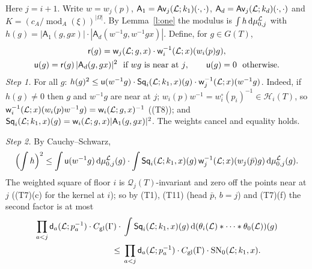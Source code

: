 \documentclass[11pt,a4paper]{article}
\makeatletter
\theoremstyle{plainx}
\theoremstyle{uprightx}
\renewenvironment{proof}[1][Proof]{\par\pushQED{\qed}\normalfont\topsep0pt\partopsep0pt
  \trivlist\item[\hskip\labelsep\itshape #1.]\ignorespaces}{\popQED\endtrivlist\@endpefalse}
\newcommand{\cL}{\mathcal{L}}
\newcommand{\dd}{\mathrm{d}}
\newcommand{\GT}[1]{G(#1)}
\newcommand{\Hl}[2]{\mathcal{H}_{#1}(#2)}
\newcommand{\Ql}[2]{\mathcal{Q}_{#1}(#2)}
\newcommand{\modA}{\operatorname{mod}_A}
\newcommand{\wl}[2]{w_{#1}(#2)}
\newcommand{\wo}[2]{w^{\circ}_{#1}(#2)}
\newcommand{\Inp}[1]{\textup{(#1)}}
\makeatother
\begin{document}
\begin{proof}[Proof of Theorem A\textup{(c)}]
Here $j=i+1$. Write $w=\wl{j}{p}$, $\mathsf{A}_1=\upperPairing{\cL}{j}{k_1}{\cdot}{\cdot}$,
$\mathsf{A}_d=\upperPairing{\cL}{j}{k_d}{\cdot}{\cdot}$ and $K=(c_A/\modA(\xi))^{|\Omega|}$. By
Lemma~\ref{l:one} the modulus is $\int h\,\dd\stackMeasure{\cL}_{0,j}$ with
$h(g)=|\mathsf{A}_1(g,gx)|\cdot|\mathsf{A}_d(w^{-1}g,w^{-1}gx)|$. Define, for $g\in\GT{T}$,
\[\begin{gathered}\mathsf{r}(g)=\floorWeight{\cL}{j}{g}{x}\cdot\invWeight{\cL}{i}{x}(\wl{i}{p}g),\\
\mathsf{u}(g)=\mathsf{r}(g)\,|\mathsf{A}_d(g,gx)|^{2}\ \text{ if $wg$ is near at $j$},\qquad\mathsf{u}(g)=0\ \text{ otherwise.}\end{gathered}\]
\emph{Step 1.} For all $g$: $h(g)^{2}\le\mathsf{u}(w^{-1}g)\cdot\weightedSquare{\cL}{i}{k_1}{x}{g}\cdot\invWeight{\cL}{j}{x}(w^{-1}g)$.
Indeed, if $h(g)\ne0$ then $g$ and $w^{-1}g$ are near at $j$; $\wl{i}{p}w^{-1}=\wo{i}{p_i}^{-1}\in\Hl{i}{T}$, so
$\invWeight{\cL}{i}{x}(\wl{i}{p}w^{-1}g)=\floorWeight{\cL}{i}{g}{x}^{-1}$ (\Inp{T8}); and
$\weightedSquare{\cL}{i}{k_1}{x}{g}=\floorWeight{\cL}{i}{g}{x}|\mathsf{A}_1(g,gx)|^2$. The weights cancel and
equality holds.

\emph{Step 2.} By Cauchy--Schwarz,
\[\Bigl(\int h\Bigr)^2\le\int\mathsf{u}(w^{-1}g)\,\dd\stackMeasure{\cL}_{0,j}(g)\cdot
\int\weightedSquare{\cL}{i}{k_1}{x}{g}\,\invWeight{\cL}{j}{x}(\wl{j}{\bar p}g)\,\dd\stackMeasure{\cL}_{0,j}(g).\]
The
weighted square of floor $i$ is $\Ql{j}{T}$-invariant and zero off the points near at $j$ (\Inp{T7}(c) for the kernel
at $i$); so by \Inp{T1}, \Inp{T11} (head $\bar p$, $b=j$) and \Inp{T7}(f) the second factor is at most
\[\begin{aligned}\prod_{a<j}\floorModulus{\cL}{a}{p_a^{-1}}\cdot\globalConst{\Gamma}\cdot{}&
\int\weightedSquare{\cL}{i}{k_1}{x}{g}\,\dd(\floorMeasure{\cL}{i}*\dots*\floorMeasure{\cL}{0})(g)\\ \le{}&
\prod_{a<j}\floorModulus{\cL}{a}{p_a^{-1}}\cdot\globalConst{\Gamma}\cdot\selfNorm{\cL}{0}{k_1}{x}.\end{aligned}\]


\end{proof}
\end{document}
